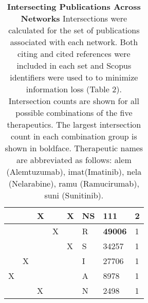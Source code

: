\documentclass[10pt,letterpaper]{article}
\begin{document}
\begin{table}[!ht]
{\begin{tabular}{|l| l| l| l| l| l| l| l|}
\hline 
 &  & X &  & X & NS & 111 & 2 \\ 
\hline
&  &  & X &  & R & \textbf{49006} & 1 \\ 
\hline 
&  &  &  & X & S & 34257 & 1 \\ 
\hline 
& X &  &  &  & I & 27706 & 1 \\ 
\hline
X &  &  &  &  & A & 8978 & 1 \\ 
\hline
&  & X &  &  & N & 2498 & 1 \\ 
\hline
\end{tabular}}
\vspace{2.5 mm}
\caption{
{\bf Intersecting Publications Across Networks} Intersections were calculated for the set of publications associated with each network. Both citing and cited references were included in each set and  Scopus identifiers were used to to minimize information loss (Table 2). Intersection counts are shown for all possible combinations of the five therapeutics. The largest intersection count in each combination group is shown in boldface. Therapeutic names are abbreviated as follows: alem (Alemtuzumab), imat(Imatinib), nela (Nelarabine), ramu (Ramucirumab), suni (Sunitinib). }
\label{table1}
\end{table}
\end{document}
